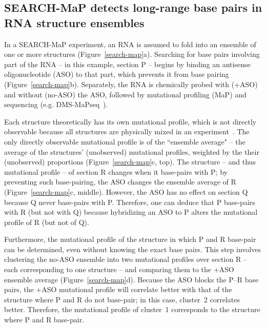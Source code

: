 \documentclass[main.tex]{subfiles}
\begin{document}
\subsection{SEARCH-MaP detects long-range base pairs in RNA structure ensembles}

In a SEARCH-MaP experiment, an RNA is assumed to fold into an ensemble of one or more structures (Figure~\ref{search-map}a).
Searching for base pairs involving part of the RNA -- in this example, section P -- begins by binding an antisense oligonucleotide (ASO) to that part, which prevents it from base pairing (Figure~\ref{search-map}b).
Separately, the RNA is chemically probed with (+ASO) and without (no-ASO) the ASO, followed by mutational profiling (MaP) and sequencing (e.g. DMS-MaPseq~\cite{Zubradt2016}).

Each structure theoretically has its own mutational profile, which is not directly observable because all structures are physically mixed in an experiment~\cite{Sherpa2015}.
The only directly observable mutational profile is of the ``ensemble average" -- the average of the structures' (unobserved) mutational profiles, weighted by the their (unobserved) proportions (Figure~\ref{search-map}c, top).
The structure -- and thus mutational profile -- of section R changes when it base-pairs with P; by preventing such base-pairing, the ASO changes the ensemble average of R (Figure~\ref{search-map}c, middle).
However, the ASO has no effect on section Q because Q never base-pairs with P.
Therefore, one can deduce that P base-pairs with R (but not with Q) because hybridizing an ASO to P alters the mutational profile of R (but not of Q).

Furthermore, the mutational profile of the structure in which P and R base-pair can be determined, even without knowing the exact base pairs.
This step involves clustering the no-ASO ensemble into two mutational profiles over section R -- each corresponding to one structure -- and comparing them to the +ASO ensemble average (Figure~\ref{search-map}d).
Because the ASO blocks the P--R base pairs, the +ASO mutational profile will correlate better with that of the structure where P and R do not base-pair; in this case, cluster~2 correlates better.
Therefore, the mutational profile of cluster~1 corresponds to the structure where P and R base-pair.
\end{document}
